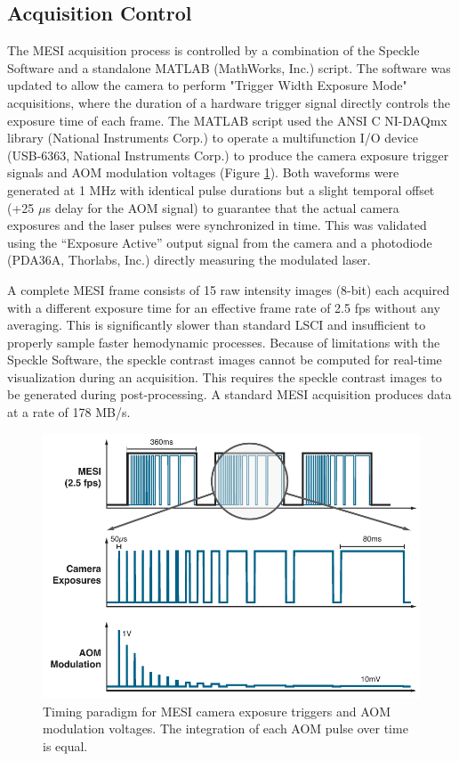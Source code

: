\subsection{Acquisition Control}

The MESI acquisition process is controlled by a combination of the Speckle Software and a standalone MATLAB (MathWorks, Inc.) script. The software was updated to allow the camera to perform "Trigger Width Exposure Mode" acquisitions, where the duration of a hardware trigger signal directly controls the exposure time of each frame. The MATLAB script used the ANSI C NI-DAQmx library (National Instruments Corp.) to operate a multifunction I/O device (USB-6363, National Instruments Corp.) to produce the camera exposure trigger signals and AOM modulation voltages (Figure \ref{fig:mesitimingschematic}). Both waveforms were generated at 1 MHz with identical pulse durations but a slight temporal offset (+25 $\mu$s delay for the AOM signal) to guarantee that the actual camera exposures and the laser pulses were synchronized in time. This was validated using the “Exposure Active” output signal from the camera and a photodiode (PDA36A, Thorlabs, Inc.) directly measuring the modulated laser.

A complete MESI frame consists of 15 raw intensity images (8-bit) each acquired with a different exposure time for an effective frame rate of 2.5 fps without any averaging. This is significantly slower than standard LSCI and insufficient to properly sample faster hemodynamic processes. Because of limitations with the Speckle Software, the speckle contrast images cannot be computed for real-time visualization during an acquisition. This requires the speckle contrast images to be generated during post-processing. A standard MESI acquisition produces data at a rate of 178 MB/s.

\begin{figure}
    \includegraphics{figures/chapter_4/mesitimingschematic.pdf}
    \caption{
        \label{fig:mesitimingschematic}
        Timing paradigm for MESI camera exposure triggers and AOM modulation voltages. The integration of each AOM pulse over time is equal.
    }
\end{figure}

